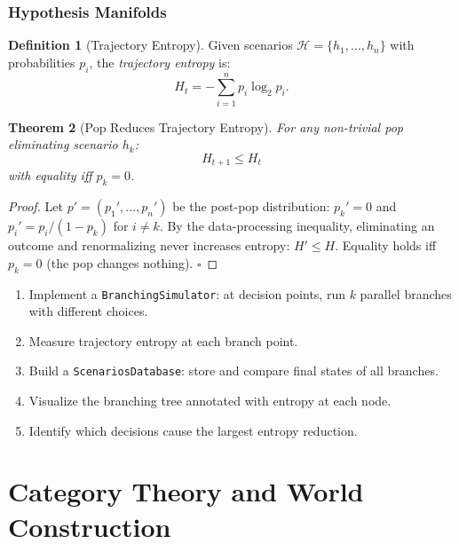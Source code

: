 \documentclass[11pt,a4paper,openany]{book}
\theoremstyle{plain}
\newtheorem{theorem}{Theorem}[chapter]
\theoremstyle{definition}
\newtheorem{definition}[theorem]{Definition}
\theoremstyle{remark}
\newenvironment{project}[1]{%
  \begin{tcolorbox}[
    title={\textbf{Project: #1}},
    colback=projectbg,
    colframe=sphereblue,
    fonttitle=\bfseries\color{white},
    coltitle=white,
    attach boxed title to top left={yshift=-2mm, xshift=4mm},
    boxed title style={colback=sphereblue, sharp corners},
    sharp corners,
    breakable,
    before upper={\normalfont\setlength{\parindent}{0pt}\tolerance=9999\hbadness=9999}
  ]
}{\end{tcolorbox}}
\begin{document}
\section{Hypothesis Manifolds}

\begin{definition}[Trajectory Entropy]
  Given scenarios $\mathcal{H} = \{h_1, \ldots, h_n\}$ with probabilities
  $p_i$, the \emph{trajectory entropy} is:
  \[
    H_t = -\sum_{i=1}^n p_i \log_2 p_i.
  \]
\end{definition}

\begin{theorem}[Pop Reduces Trajectory Entropy]
  For any non-trivial pop eliminating scenario $h_k$:
  \[
    H_{t+1} \leq H_t
  \]
  with equality iff $p_k = 0$.
\end{theorem}
\begin{proof}
  Let $p' = (p_1', \ldots, p_n')$ be the post-pop distribution:
  $p_k' = 0$ and $p_i' = p_i/(1-p_k)$ for $i \neq k$.
  By the data-processing inequality, eliminating an outcome and
  renormalizing never increases entropy: $H' \leq H$. Equality holds
  iff $p_k = 0$ (the pop changes nothing). $\square$
\end{proof}

\begin{project}{Branching Historical Simulations}
  \begin{enumerate}
    \item Implement a \texttt{BranchingSimulator}: at decision points,
          run $k$ parallel branches with different choices.
    \item Measure trajectory entropy at each branch point.
    \item Build a \texttt{ScenariosDatabase}: store and compare final
          states of all branches.
    \item Visualize the branching tree annotated with entropy at each node.
    \item Identify which decisions cause the largest entropy reduction.
  \end{enumerate}
\end{project}


\part{Category Theory and World Construction}
\end{document}

